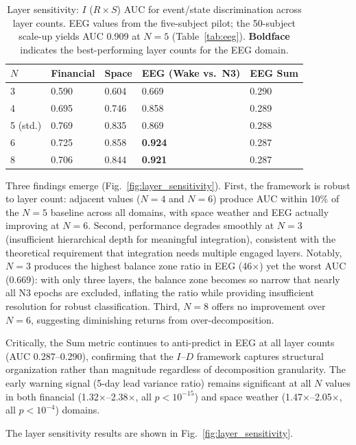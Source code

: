 \documentclass[12pt,a4paper]{article}
\begin{document}
\begin{table}[H]
\caption{Layer sensitivity: $I$ ($R \times S$) AUC for event/state discrimination across layer counts. EEG values from the five-subject pilot; the 50-subject scale-up yields AUC 0.909 at $N=5$ (Table~\ref{tab:eeg}). \textbf{Boldface} indicates the best-performing layer counts for the EEG domain.\label{tab:layers_sensitivity}}
\begin{tabular}{@{}lllll@{}}
\toprule
$N$ & Financial & Space & EEG (Wake vs.\ N3) & EEG Sum \\
\midrule
3 & 0.590 & 0.604 & 0.669 & 0.290 \\
4 & 0.695 & 0.746 & 0.858 & 0.289 \\
5 (std.) & 0.769 & 0.835 & 0.869 & 0.288 \\
6 & 0.725 & 0.858 & \textbf{0.924} & 0.287 \\
8 & 0.706 & 0.844 & \textbf{0.921} & 0.287 \\
\bottomrule
\end{tabular}
\end{table}

Three findings emerge (Fig.~\ref{fig:layer_sensitivity}). First, the framework is robust to layer count: adjacent values ($N = 4$ and $N = 6$) produce AUC within 10\% of the $N = 5$ baseline across all domains, with space weather and EEG actually improving at $N = 6$. Second, performance degrades smoothly at $N = 3$ (insufficient hierarchical depth for meaningful integration), consistent with the theoretical requirement that integration needs multiple engaged layers. Notably, $N = 3$ produces the highest balance zone ratio in EEG (46$\times$) yet the worst AUC (0.669): with only three layers, the balance zone becomes so narrow that nearly all N3 epochs are excluded, inflating the ratio while providing insufficient resolution for robust classification. Third, $N = 8$ offers no improvement over $N = 6$, suggesting diminishing returns from over-decomposition.

Critically, the Sum metric continues to anti-predict in EEG at all layer counts (AUC 0.287--0.290), confirming that the $I$--$D$ framework captures structural organization rather than magnitude regardless of decomposition granularity. The early warning signal (5-day lead variance ratio) remains significant at all $N$ values in both financial (1.32$\times$--2.38$\times$, all $p < 10^{-15}$) and space weather (1.47$\times$--2.05$\times$, all $p < 10^{-4}$) domains.

The layer sensitivity results are shown in Fig.~\ref{fig:layer_sensitivity}.
\end{document}
